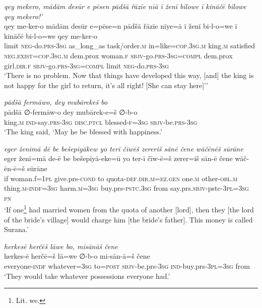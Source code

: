 \ea \label{ŽP.242}
\textit{qey mekero, mādām desūr e pēsen pādšā řāzīe nīā ī ženī bilowe ī kināčē bilowe qey mekero!’} \\ 
\gll qey me-ker-o mādām desūr e=pēse=n pādšā řāzīe nīye=ā ī ženī bi-l-o=we ī kināčē bi-l-o=we qey me-ker-o \\ 
 limit \textsc{neg-}do\textsc{.prs}\textsc{-3sg} as\_long\_as task/order\textsc{.m} in=like\textsc{=cop}\textsc{.3sg}\textsc{.m} king\textsc{.m} satisfied \textsc{\textsc{neg.}exist}\textsc{=cop}\textsc{.3sg}\textsc{.m} dem.prox woman\textsc{.f} \textsc{sbjv-}go\textsc{.prs}\textsc{-3sg}\textsc{=compl} dem.prox girl\textsc{.dir}\textsc{.f} \textsc{sbjv-}go\textsc{.prs}\textsc{-3sg}\textsc{=compl} limit \textsc{neg-}do\textsc{.prs}\textsc{-3sg} \\ 
\glt `There is no problem. Now that things have developed this way, [and] the king is not happy for the girl to return, it’s all right! [She can stay here]’'
\z 
 
\ea \label{ŽP.260}
\textit{pādšā fermāwo, dey mubārekeš bo} \\ 
\gll pādšā ∅-fermāw-o dey mubārek-e=š ∅-b-o \\ 
 king\textsc{.m} \textsc{ind-}say\textsc{.prs}\textsc{-3sg} \textsc{disc.ptcl} blessed\textsc{-f}\textsc{=3sg} \textsc{sbjv-}be\textsc{.prs}\textsc{-3sg} \\ 
\glt `The king said, ‘May he be blessed with happiness.'
\z 
 
\ea \label{BP.18}
\textit{eger ženīmā dē be bešepīyākew yo terī čīwēš zereriš sānē čene wāčēnēš sūrāne} \\ 
\gll eger ženī=mā de-ē be bešepīyā-eke=ū yo ter-ī čīw-ē=š zerer=iš sān-ē čene wāč-ēn-ē=š sūrāne \\ 
 if woman.f\textsc{=\textsc{1pl}} give.prs\textsc{-cond} to quota\textsc{-def}\textsc{.dir}\textsc{.m}\textsc{=ez.gen} one\textsc{.m} other\textsc{-obl}\textsc{.m} thing\textsc{.m}\textsc{-indf}\textsc{=3sg} harm\textsc{.m}\textsc{=3sg} buy.prs\textsc{-pstc}\textsc{.3sg} from say.prs.\textsc{sbjv-}pstc\textsc{-3pl}\textsc{=3sg} \textsc{pn} \\ 
\glt `If one\footnote{Lit. we.} had married women from the quota of another [lord], then they [the lord of the bride's village] would charge him [the bride’s father]. This money is called Surana.'
\z 
 
\ea \label{BP.30}
\textit{herkesē herčēš lāwe bo, misānāš čene} \\ 
\gll herkes-ē herčē=š lā=we ∅-b-o mi-sān-ā=š čene \\ 
 everyone\textsc{-indf} whatever\textsc{=3sg} to\textsc{=\textsc{post}} \textsc{sbjv-}be.prs\textsc{-3sg} \textsc{ind-}buy.prs\textsc{-3pl}\textsc{=3sg} from \\ 
\glt `They would take whatever possessions everyone had.'
\z 
 
